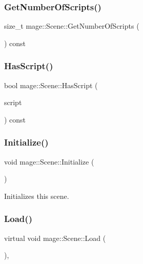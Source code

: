 \subsubsection{\texorpdfstring{Get\+Number\+Of\+Scripts()}{GetNumberOfScripts()}}
{\footnotesize\ttfamily size\+\_\+t mage\+::\+Scene\+::\+Get\+Number\+Of\+Scripts (\begin{DoxyParamCaption}{ }\end{DoxyParamCaption}) const}

\hypertarget{classmage_1_1_scene_a9dd6c49e9db7590de1de4fbd128c78a9}{}\label{classmage_1_1_scene_a9dd6c49e9db7590de1de4fbd128c78a9} 
\subsubsection{\texorpdfstring{Has\+Script()}{HasScript()}}
{\footnotesize\ttfamily bool mage\+::\+Scene\+::\+Has\+Script (\begin{DoxyParamCaption}\item[{\hyperlink{namespacemage_a1e01ae66713838a7a67d30e44c67703e}{Shared\+Ptr}$<$ const \hyperlink{classmage_1_1_behavior_script}{Behavior\+Script} $>$}]{script }\end{DoxyParamCaption}) const}

\hypertarget{classmage_1_1_scene_a3cd12ef381ca743bf0b8f8aa2a76eb57}{}\label{classmage_1_1_scene_a3cd12ef381ca743bf0b8f8aa2a76eb57} 
\subsubsection{\texorpdfstring{Initialize()}{Initialize()}}
{\footnotesize\ttfamily void mage\+::\+Scene\+::\+Initialize (\begin{DoxyParamCaption}{ }\end{DoxyParamCaption})}

Initializes this scene. \hypertarget{classmage_1_1_scene_a1fb4a93eaa2f6a9e20594e205abb9a32}{}\label{classmage_1_1_scene_a1fb4a93eaa2f6a9e20594e205abb9a32} 
\subsubsection{\texorpdfstring{Load()}{Load()}}
{\footnotesize\ttfamily virtual void mage\+::\+Scene\+::\+Load (\begin{DoxyParamCaption}{ }\end{DoxyParamCaption})\hspace{0.3cm}{\ttfamily [private]}, {\ttfamily [virtual]}}

